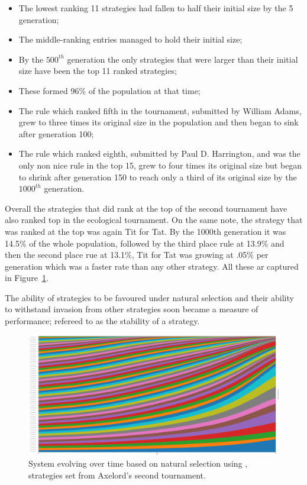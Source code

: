 \documentclass{article}
\begin{document}
\begin{itemize}
    \item The lowest ranking 11 strategies had fallen to half their initial size
    by the 5 generation;
    \item The middle-ranking entries managed to hold their initial size;
    \item By the \(500^{th}\) generation the only strategies that were larger than their
    initial size have been the top 11 ranked strategies;
    \item These formed 96\% of the population at that time;
    \item The rule which ranked fifth in the tournament, submitted by William Adams,
    grew to three times its original size in the population and then began to sink
    after generation 100;
    \item The rule which ranked eighth, submitted by Paul D. Harrington, and was
    the only non nice rule in the top 15, grew to four times its original size but
    began to shrink after generation 150 to reach only a third of its original
    size by the \(1000^{th}\) generation.
\end{itemize}

Overall the strategies that did rank at the top of the second tournament have
also ranked top in the ecological tournament. On the same note, the strategy that
was ranked at the top was again Tit for Tat. By the 1000th generation it was 14.5\%
of the whole population, followed by the third place rule at 13.9\% and then the
second place rue at 13.1\%, Tit for Tat was growing at .05\% per generation which
was a faster rate than any other strategy. All these ar captured in
Figure~\ref{fig:ecological.tournament}.

The ability of strategies to be favoured under natural selection and their
ability to withstand invasion from other strategies soon became a measure
of performance; refereed to as the stability of a strategy.

\begin{figure}[!hbtp]
    \centering
    \includegraphics[width=.6\textwidth]{./assets/images/ecological.pdf}
    \caption{System evolving over time based on natural selection using
    \cite{axelrodproject}, strategies set from Axelord's second tournament.}
    \label{fig:ecological.tournament}
\end{figure}
\end{document}

